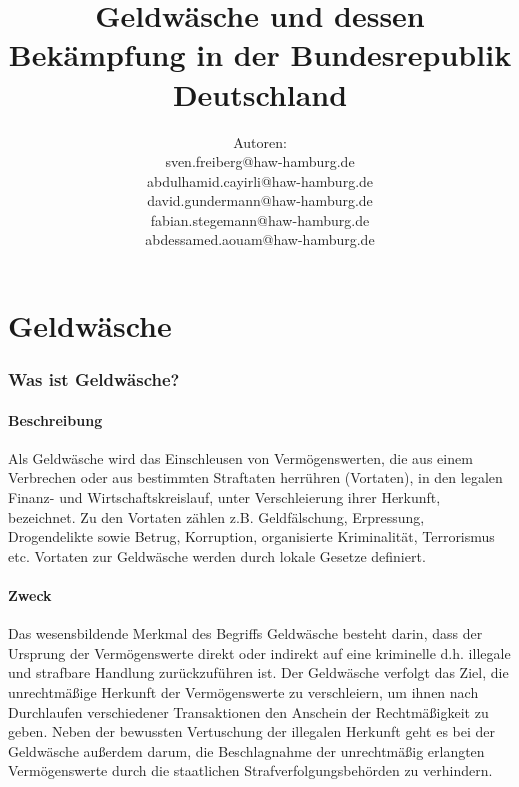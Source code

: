 \documentclass{article}
\begin{document}
\title{Geldwäsche und dessen Bekämpfung in der Bundesrepublik Deutschland}
\author{
    Autoren:\\
    sven.freiberg@haw-hamburg.de\\ 
    abdulhamid.cayirli@haw-hamburg.de\\
    david.gundermann@haw-hamburg.de\\
    fabian.stegemann@haw-hamburg.de\\
    abdessamed.aouam@haw-hamburg.de
}
\maketitle

\tableofcontents


\newpage

\part[Geldwäsche]{Geldwäsche}

    \section[Was ist Geldwäsche?]{Was ist Geldwäsche?}
            
        \subsection[Beschreibung]{Beschreibung}

            Als Geldwäsche wird das Einschleusen von Vermögenswerten, die aus einem Verbrechen oder aus bestimmten Straftaten herrühren (Vortaten), in den legalen Finanz- und Wirtschaftskreislauf, unter Verschleierung ihrer Herkunft, bezeichnet. Zu den Vortaten zählen z.B. Geldfälschung, Erpressung, Drogendelikte sowie Betrug, Korruption, organisierte Kriminalität, Terrorismus etc. Vortaten zur Geldwäsche werden durch lokale Gesetze definiert.
        
        \subsection[Zweck]{Zweck}

            Das wesensbildende Merkmal des Begriffs Geldwäsche besteht darin, dass der Ursprung der Vermögenswerte direkt oder indirekt auf eine kriminelle d.h. illegale und strafbare Handlung zurückzuführen ist.
            Der Geldwäsche verfolgt das Ziel, die unrechtmäßige Herkunft der Vermögenswerte zu verschleiern, um ihnen nach Durchlaufen verschiedener Transaktionen den Anschein der Rechtmäßigkeit zu geben. 
            Neben der bewussten Vertuschung der illegalen Herkunft geht es bei der Geldwäsche außerdem darum, die Beschlagnahme der unrechtmäßig erlangten Vermögenswerte durch die staatlichen Strafverfolgungsbehörden zu verhindern.
\end{document}
